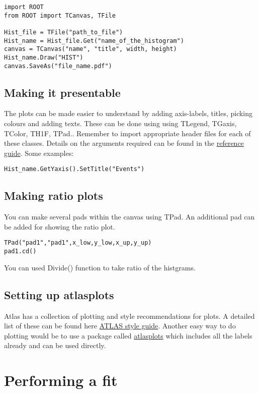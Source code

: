 \documentclass[letterpaper,12pt]{article}
\begin{document}
\begin{lstlisting}
import ROOT
from ROOT import TCanvas, TFile

Hist_file = TFile("path_to_file")
Hist_name = Hist_file.Get("name_of_the_histogram")
canvas = TCanvas("name", "title", width, height)
Hist_name.Draw("HIST")
canvas.SaveAs("file_name.pdf")

\end{lstlisting}

\subsection{Making it presentable}
The plots can be made easier to understand by adding axis-labels, titles, picking colours and adding texts. These can be done using  using TLegend, TGaxis, TColor, TH1F, TPad.. Remember to import appropriate header files for each of these classes. 
Details on the arguments required can be found in the \href{https://root.cern/doc/master/}{reference guide}. Some examples:

\begin{lstlisting}
Hist_name.GetYaxis().SetTitle("Events")
\end{lstlisting}

\subsection{Making ratio plots}
You can make several pads within the canvas using TPad. An additional pad can be added for showing the ratio plot. 
\begin{lstlisting}
TPad("pad1","pad1",x_low,y_low,x_up,y_up)
pad1.cd()
\end{lstlisting} 
You can used Divide() function to take ratio of the histgrams.
\subsection{Setting up atlasplots}
Atlas has a collection of plotting and style recommendations for plots. A detailed list of these can be found here \href{https://cds.cern.ch/record/1110290/files/gen-pub-2008-001.pdf}{ATLAS style guide}. Another easy way to do plotting would be to use a package called \href{https://atlas-plots.readthedocs.io/en/latest/index.html}{atlasplots} which includes all the labels already and can be used directly.

\section{Performing a fit}
\end{document}
